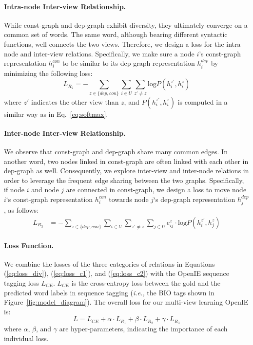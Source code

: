 \documentclass[11pt]{article}
\newcommand{\ie}{\emph{i.e.,}\xspace}
\begin{document}
\paragraph{Intra-node Inter-view Relationship.}
While const-graph and dep-graph exhibit diversity, they ultimately converge on a common set of words.
The same word, although bearing different syntactic functions, well connects the two views.
Therefore, we design a loss for the intra-node and inter-view relations. Specifically, we make sure a node $i$'s const-graph representation $h_i^{con}$ to be similar to its dep-graph representation $h_i^{dep}$ by minimizing the following loss:
\begin{equation}\label{eq:loss_c1}
    L_{R_2} = - \sum_{z\in \{dep,con\}} \sum_{i \in U} \sum_{z' \not= z}  \mathrm{log}  P(h_i^{z'} ,h_i^z)
\end{equation}
where $z'$ indicates the other view than $z$, and $ P(h_i^{z'} ,h_i^z)$ is computed in a similar way as in Eq.~\ref{eq:softmax}.




\paragraph{Inter-node Inter-view Relationship.}
We observe that const-graph and dep-graph share many common edges. In another word, two nodes linked in const-graph are often linked with each other in dep-graph as well.
Consequently, we explore inter-view and inter-node relations in order to leverage the frequent edge sharing between the two graphs.
Specifically, if node $i$ and node $j$ are connected in const-graph, we design a loss to move node $i$`s const-graph representation $h_i^{con}$ towards node $j$`s dep-graph representation $h_j^{dep}$, as follows:
\begin{align}\label{eq:loss_c2}
    L_{R_3} &= - \sum_{z \in \{dep, con\}} \sum_{i \in U} \sum_{z' \not= z} \sum_{j \in U} e_{ij}^z \cdot \mathrm{log} P(h_i^{z'} , h_j^z)
\end{align}

\paragraph{Loss Function.}
We combine the losses of the three categories of relations in Equations (\ref{eq:loss_div}), (\ref{eq:loss_c1}), and (\ref{eq:loss_c2}) with the OpenIE sequence tagging loss $L_{CE}$. $L_{CE}$ is the cross-entropy loss between the gold and the predicted word labels in sequence tagging (\ie the BIO tags shown in Figure~\ref{fig:model_diagram}). The overall loss for our multi-view learning OpenIE is:
\begin{equation}
 L = L_{CE} + \alpha \cdot L_{R_1} + \beta \cdot  L_{R_2} + \gamma \cdot L_{R_3}
\end{equation}
where  $\alpha$, $\beta$, and $\gamma$ are hyper-parameters, indicating the importance of each individual loss. 
\end{document}
